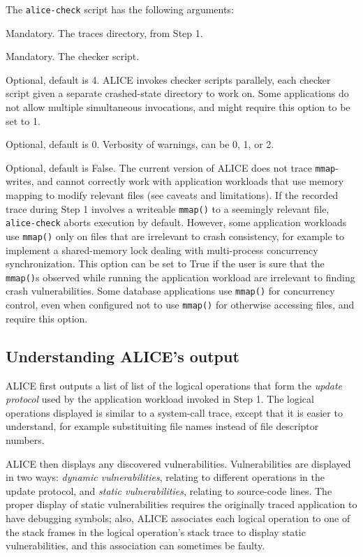 \documentclass[oneside]{memoir}
\begin{document}
The \verb;alice-check; script has the following arguments:

\begin{description}[leftmargin=!, labelindent=1.2cm, itemindent=-0.5cm]\itemsep1pt \parskip0pt 
\item[traces\_dir] Mandatory. The traces directory, from \textmd{Step 1}.
\item[checker] Mandatory. The checker script.
\item[threads] Optional, default is 4. ALICE invokes checker scripts parallely, each checker script given a separate crashed-state directory to work on. Some applications do not allow multiple simultaneous invocations, and might require this option to be set to 1.
\item[debug\_level] Optional, default is 0. Verbosity of warnings, can be 0, 1, or 2.
\item[ignore\_mmap] Optional, default is False. The current version of ALICE does not trace \verb;mmap;-writes, and cannot correctly work with application workloads that use memory mapping to modify relevant files (see caveats and limitations). If the recorded trace during \textmd{Step 1} involves a writeable \verb;mmap(); to a seemingly relevant file, \verb;alice-check; aborts execution by default. However, some application workloads use \verb;mmap(); only on files that are irrelevant to crash consistency, for example to implement a shared-memory lock dealing with multi-process concurrency synchronization. This option can be set to True if the user is sure that the \verb;mmap();s observed while running the application workload are irrelevant to finding crash vulnerabilities. Some database applications use \verb;mmap(); for concurrency control, even when configured not to use \verb;mmap(); for otherwise accessing files, and require this option.
\end{description}

\subsection{Understanding ALICE's output}
ALICE first outputs a list of list of the logical operations that form the \textit{update protocol} used by the application workload invoked in \textmd{Step 1}. The logical operations displayed is similar to a system-call trace, except that it is easier to understand, for example substituiting file names instead of file descriptor numbers.

ALICE then displays any discovered vulnerabilities. Vulnerabilities are displayed in two ways: \textit{dynamic vulnerabilities}, relating to different operations in the update protocol, and \textit{static vulnerabilities}, relating to source-code lines. The proper display of static vulnerabilities requires the originally traced application to have debugging symbols; also, ALICE associates each logical operation to one of the stack frames in the logical operation's stack trace to display static vulnerabilities, and this association can sometimes be faulty.
\end{document}
